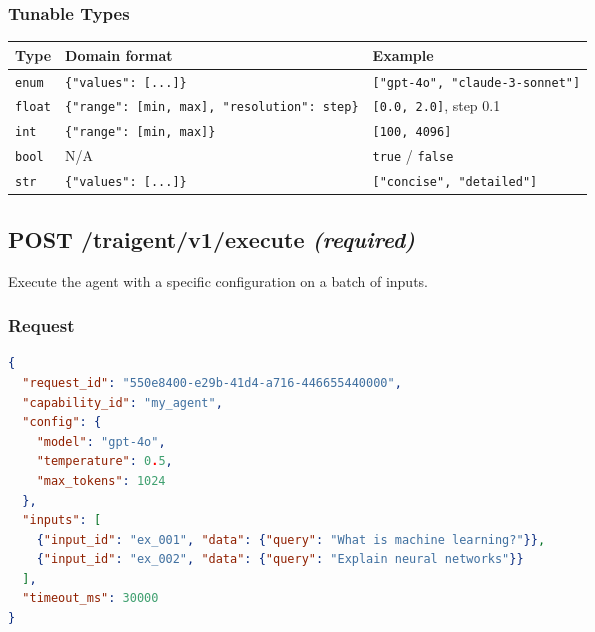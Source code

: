 \documentclass[11pt,a4paper]{article}
\begin{document}
\subsubsection{Tunable Types}

\begin{center}\small
\begin{tabularx}{\textwidth}{@{}llX@{}}
\toprule
\textbf{Type} & \textbf{Domain format} & \textbf{Example} \\
\midrule
\texttt{enum}  & \texttt{\{"values": [...]\}} & \texttt{["gpt-4o", "claude-3-sonnet"]} \\
\texttt{float} & \texttt{\{"range": [min, max], "resolution": step\}} & \texttt{[0.0, 2.0]}, step 0.1 \\
\texttt{int}   & \texttt{\{"range": [min, max]\}} & \texttt{[100, 4096]} \\
\texttt{bool}  & N/A & \texttt{true} / \texttt{false} \\
\texttt{str}   & \texttt{\{"values": [...]\}} & \texttt{["concise", "detailed"]} \\
\bottomrule
\end{tabularx}
\end{center}

\subsection{POST /traigent/v1/execute \normalfont\textit{(required)}}\label{sec:execute}

Execute the agent with a specific configuration on a batch of inputs.

\subsubsection{Request}

\begin{lstlisting}[language=json]
{
  "request_id": "550e8400-e29b-41d4-a716-446655440000",
  "capability_id": "my_agent",
  "config": {
    "model": "gpt-4o",
    "temperature": 0.5,
    "max_tokens": 1024
  },
  "inputs": [
    {"input_id": "ex_001", "data": {"query": "What is machine learning?"}},
    {"input_id": "ex_002", "data": {"query": "Explain neural networks"}}
  ],
  "timeout_ms": 30000
}
\end{lstlisting}
\end{document}
